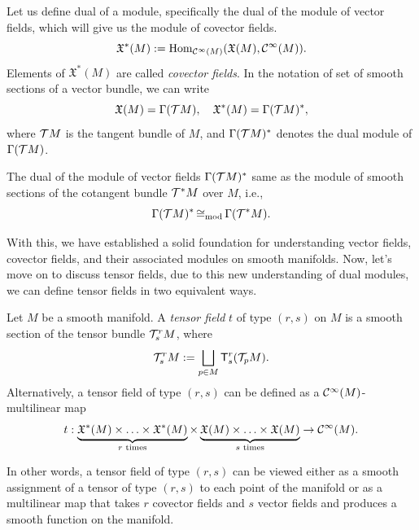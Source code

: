 Let us define dual of a module, specifically the dual of the module of vector fields, which will give us the module of covector fields.
\begin{equation}
	\mathfrak{X}^*(M) := \operatorname{Hom}_{\mathcal C^\infty(M)}(\mathfrak{X}(M), \mathcal C^\infty(M)).
\end{equation}
Elements of \(\mathfrak{X}^*(M)\) are called \emph{covector fields}. In the notation of set of smooth sections of a vector bundle, we can write
\begin{equation*}
	\mathfrak{X}(M) = \Gamma(\mathcal T M), \quad \mathfrak{X}^*(M) = \Gamma(\mathcal T M)^*,
\end{equation*}
where \(\mathcal T M\) is the tangent bundle of \(M\), and \(\Gamma(\mathcal T M)^*\) denotes the dual module of \(\Gamma(\mathcal T M)\).
\begin{proposition}
	The dual of the module of vector fields \(\Gamma(\mathcal T M)^*\) same as the module of smooth sections of the cotangent bundle \(\mathcal T^*M\) over \(M\), i.e.,
	\begin{equation}
		\Gamma(\mathcal T M)^* \operatorname{\mathrel{\cong_{\text{mod}}}} \Gamma(\mathcal T^* M).
	\end{equation}
\end{proposition}
With this, we have established a solid foundation for understanding vector fields, covector fields, and their associated modules on smooth manifolds. Now, let's move on to discuss tensor fields, due to this new understanding of dual modules, we can define tensor fields in two equivalent ways.
\begin{definition}
	Let \(M\) be a smooth manifold. A \emph{tensor field} \(t\) of type \((r, s)\) on \(M\) is a smooth section of the tensor bundle \(\mathcal T^r_s M\), where
	\begin{equation}
		\mathcal T^r_s M := \bigsqcup_{p \in M} \mathsf{T}^r_s(\mathcal T_p M).
	\end{equation}
	Alternatively, a tensor field of type \((r, s)\) can be defined as a \(\mathcal C^\infty(M)\)-multilinear map
	\begin{equation}
		t: \underbrace{\mathfrak{X}^*(M) \times \ldots \times \mathfrak{X}^*(M)}_{r \text{ times}} \times \underbrace{\mathfrak{X}(M) \times \ldots \times \mathfrak{X}(M)}_{s \text{ times}} \to \mathcal C^\infty(M).
	\end{equation}
\end{definition}
In other words, a tensor field of type \((r, s)\) can be viewed either as a smooth assignment of a tensor of type \((r, s)\) to each point of the manifold or as a multilinear map that takes \(r\) covector fields and \(s\) vector fields and produces a smooth function on the manifold.

